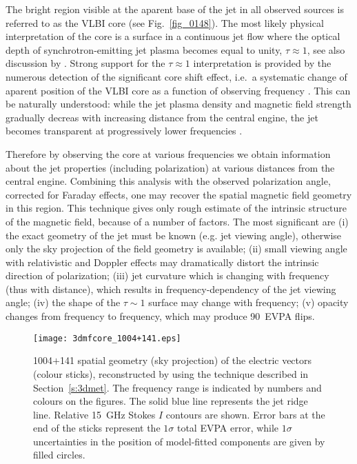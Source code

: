 \documentclass[a4paper,fleqn,usenatbib,useAMS]{mnras}
\begin{document}
The bright region visible at the aparent base of the jet in all observed sources is referred to as the VLBI core (see Fig.~\ref{fig_0148}).
The most likely physical interpretation of the core is a surface in a continuous jet flow where the optical depth of synchrotron-emitting jet plasma becomes equal to unity, $\tau \approx 1$, see also discussion by \cite{marscher08}.
Strong support for the $\tau \approx 1$ interpretation is provided by the numerous detection of the significant core shift effect, i.e.\ a systematic change of aparent position of the VLBI core as a function of observing frequency \citep[e.g.][]{kovalev_etal08,2009MNRAS.400...26O,2011Natur.477..185H,sokolovsky_etal11,pushkarev_etal12}. 
This can be naturally understood: while the jet plasma density and magnetic field strength gradually decreas with increasing distance from the central engine, the jet becomes transparent at progressively lower frequencies \citep[see][]{marcaide_shapiro_84,lobanov98,kutkin_etal14}.

Therefore by observing the core at various frequencies we obtain information about the jet properties (including polarization) at various distances from the central engine.
Combining this analysis with the observed polarization angle, corrected for Faraday effects, one may  recover the spatial magnetic field geometry in this region.
This technique gives only rough estimate of the intrinsic structure of the magnetic field, because of a number of factors.
The most significant are (i) the exact geometry of the jet must be known (e.g. jet viewing angle), otherwise only the sky projection of the field geometry is available; (ii) small viewing angle with relativistic and Doppler effects may dramatically distort the intrinsic direction of polarization; (iii) jet curvature which is changing with frequency (thus with distance), which results in frequency-dependency of the jet viewing angle; (iv) the shape of the $\tau\sim1$ surface may change with frequency; (v) opacity changes from frequency to frequency, which may produce 90\degr\ EVPA flips.


\begin{figure}
 \centering
 \texttt{[image: 3dmfcore\_1004+141.eps]}
 \caption{1004$+$141 spatial geometry (sky projection) of the electric vectors (colour sticks), reconstructed by using the technique described in Section~\ref{s:3dmet}.  The frequency range is indicated by numbers and colours on the figures. The solid blue line represents the jet ridge line.
 Relative 15~GHz Stokes $I$ contours are shown.
 Error bars at the end of the sticks represent the $1\sigma$ total EVPA error, while $1\sigma$ uncertainties in the position of model-fitted components are given by filled circles.
 \label{mfcore_3d}
 }
\end{figure}
\end{document}
